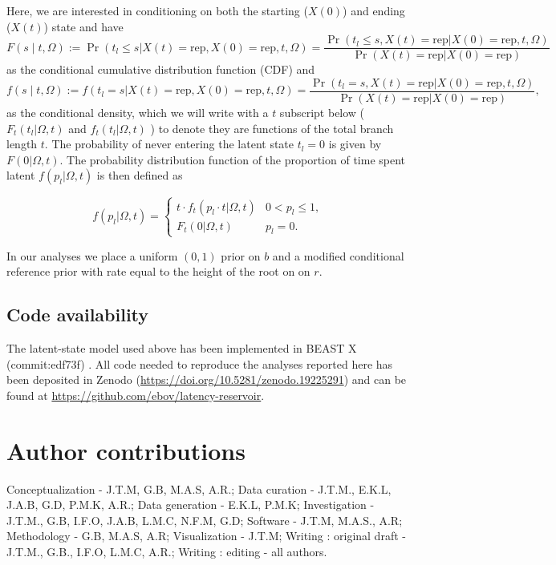 \documentclass[11pt,a4paper]{article}
\begin{document}
Here, we are interested in conditioning on both the starting ($X(0)$) and ending ($X(t)$) state and have
\begin{equation}
    F(s \mid t,\Omega) := \operatorname{Pr}(t_l\leq s|X(t)=\text{rep},X(0)=\text{rep},t,\Omega) =  \frac{\operatorname{Pr}(t_l\leq s,X(t)=\text{rep}|X(0)=\text{rep},t,\Omega)}{\operatorname{Pr}(X(t)=\text{rep}|X(0)=\text{rep})}
\end{equation}
as the conditional cumulative distribution function (CDF) and 
\begin{equation}
   f(s \mid t,\Omega) := f(t_l= s|X(t)=\text{rep},X(0)=\text{rep},t,\Omega) =  \frac{\operatorname{Pr}(t_l =  s,X(t)=\text{rep}|X(0)=\text{rep},t,\Omega)}{\operatorname{Pr}(X(t)=\text{rep}|X(0)=\text{rep})},
\end{equation}
as the conditional density, which we will write with a $t$ subscript below ( $F_t(t_l|\Omega,t)$ and $f_t(t_l|\Omega,t)$ ) to denote they are functions of the total branch length $t$. 
The probability of never entering the latent state $t_l = 0$ is given by $F(0|\Omega,t)$.
The probability distribution function of the proportion of time spent latent $f(p_{l}|\Omega,t)$ is then defined as

\begin{equation}
    f(p_{l}|\Omega,t) = \begin{cases}
        t\cdot f_t(p_l\cdot t|\Omega,t) & 0<p_l\leq1, \\
        F_t(0|\Omega,t) & p_l =0.
    \end{cases} 
\end{equation}


In our analyses we place a uniform $(0,1)$ prior on $b$ and a modified conditional reference prior with rate equal to the height of the root on on $r$.


\subsection*{Code availability}
The latent-state model used above has been implemented in BEAST X (commit:edf73f) \cite{BEASTX}. 
All code needed to reproduce the analyses reported here has been deposited in Zenodo (\url{https://doi.org/10.5281/zenodo.19225291}) and can be found at \url{https://github.com/ebov/latency-reservoir}.


\section*{Author contributions}
Conceptualization - J.T.M, G.B, M.A.S, A.R.;
Data curation - J.T.M., E.K.L, J.A.B, G.D, P.M.K, A.R.;
Data generation - E.K.L, P.M.K;
Investigation - J.T.M., G.B, I.F.O, J.A.B, L.M.C, N.F.M, G.D;
Software - J.T.M, M.A.S., A.R;
Methodology - G.B, M.A.S, A.R;
Visualization - J.T.M;
Writing : original draft - J.T.M., G.B., I.F.O, L.M.C, A.R.;
Writing : editing - all authors.
\end{document}
